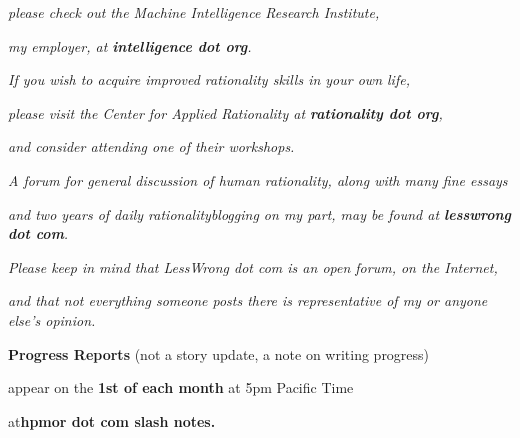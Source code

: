 \emph{please check out the Machine Intelligence Research Institute,}

\emph{my employer, at \textbf{intelligence dot org}.}

\emph{If you wish to acquire improved rationality skills in your own
life,}

\emph{please visit the Center for Applied Rationality at
\textbf{rationality dot org},}

\emph{and consider attending one of their workshops.}

\emph{A forum for general discussion of human rationality, along with
many fine essays}

\emph{and two years of daily rationalityblogging on my part, may be
found at \textbf{lesswrong dot com}.}

\emph{Please keep in mind that LessWrong dot com is an open forum, on
the Internet,}

\emph{and that not everything someone posts there is representative of
my or anyone else's opinion.}

\textbf{Progress Reports} (not a story update, a note on writing
progress)

appear on the \textbf{1st of each month} at 5pm Pacific Time

at\textbf{hpmor dot com slash notes.}
